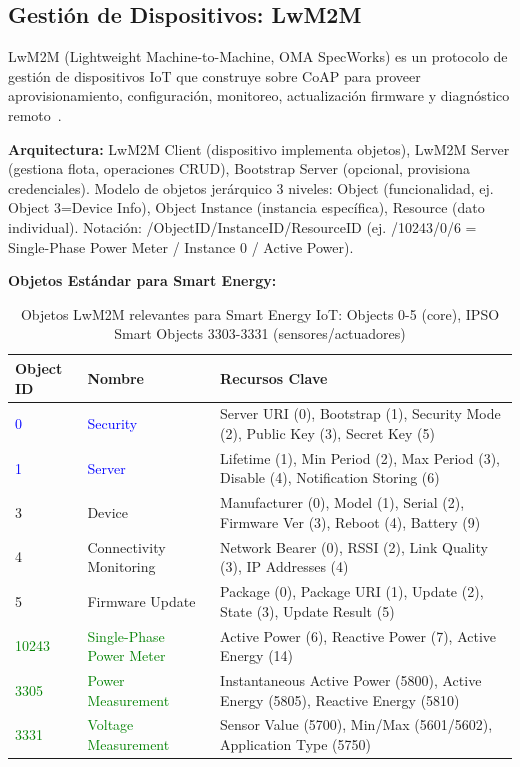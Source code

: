 \subsection{Gestión de Dispositivos: LwM2M}

LwM2M (Lightweight Machine-to-Machine, OMA SpecWorks) es un protocolo de gestión de dispositivos IoT que construye sobre CoAP para proveer aprovisionamiento, configuración, monitoreo, actualización firmware y diagnóstico remoto~\cite{haEnablingDynamicLightweight2018,shahinzadehSmartHomeConnectivity2024,karimiIIoTCommunicationProtocols2025,omaLwM2MGuidelinesv2}.

\textbf{Arquitectura:} LwM2M Client (dispositivo implementa objetos), LwM2M Server (gestiona flota, operaciones CRUD), Bootstrap Server (opcional, provisiona credenciales). Modelo de objetos jerárquico 3 niveles: Object (funcionalidad, ej. Object 3=Device Info), Object Instance (instancia específica), Resource (dato individual). Notación: /ObjectID/InstanceID/ResourceID (ej. /10243/0/6 = Single-Phase Power Meter / Instance 0 / Active Power).

\textbf{Objetos Estándar para Smart Energy:}

\begin{table}[h]
\centering
\small
\caption{Objetos LwM2M relevantes para Smart Energy IoT: Objects 0-5 (core), IPSO Smart Objects 3303-3331 (sensores/actuadores)}
\label{tab:lwm2m-objects}
\begin{tabular}{|p{1.5cm}|p{3.5cm}|p{7cm}|}
\hline
\rowcolor{gray!20}
\textbf{Object ID} & \textbf{Nombre} & \textbf{Recursos Clave} \\
\hline
\textcolor{blue}{0} & \textcolor{blue}{Security} & Server URI (0), Bootstrap (1), Security Mode (2), Public Key (3), Secret Key (5) \\
\hline
\textcolor{blue}{1} & \textcolor{blue}{Server} & Lifetime (1), Min Period (2), Max Period (3), Disable (4), Notification Storing (6) \\
\hline
3 & Device & Manufacturer (0), Model (1), Serial (2), Firmware Ver (3), Reboot (4), Battery (9) \\
\hline
4 & Connectivity Monitoring & Network Bearer (0), RSSI (2), Link Quality (3), IP Addresses (4) \\
\hline
5 & Firmware Update & Package (0), Package URI (1), Update (2), State (3), Update Result (5) \\
\hline
\textcolor{green}{10243} & \textcolor{green}{Single-Phase Power Meter} & Active Power (6), Reactive Power (7), Active Energy (14) \\
\hline
\textcolor{green}{3305} & \textcolor{green}{Power Measurement} & Instantaneous Active Power (5800), Active Energy (5805), Reactive Energy (5810) \\
\hline
\textcolor{green}{3331} & \textcolor{green}{Voltage Measurement} & Sensor Value (5700), Min/Max (5601/5602), Application Type (5750) \\
\hline
\end{tabular}
\end{table}

